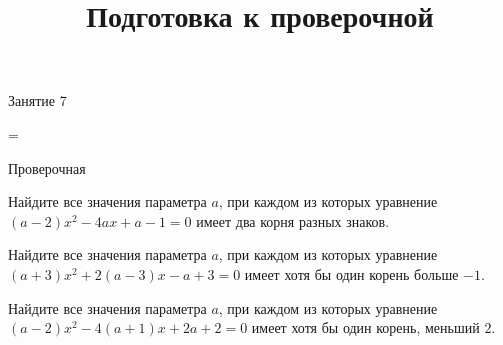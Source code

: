 \begin{class}[number=7]
	\title{Подготовка к проверочной}
	\begin{listofex}
		\item Занятие 7
	\end{listofex}
\end{class}

=%
\begin{exam}
	\begin{listofex}
		\item Проверочная
	\end{listofex}
\end{exam}

\begin{consultation}
	\begin{listofex}
		\item Найдите все значения параметра \( a \), при каждом из которых уравнение \( (a-2)x^2-4ax+a-1=0 \) имеет два корня разных знаков.
		\item Найдите все значения параметра \( a \), при каждом из которых уравнение \( (a+3)x^2+2(a-3)x-a+3=0 \) имеет хотя бы один корень больше \( -1 \).
		\item Найдите все значения параметра \( a \), при каждом из которых уравнение \( (a-2)x^2-4(a+1)x+2a+2=0 \) имеет хотя бы один корень, меньший \( 2 \).
	\end{listofex}
\end{consultation}
